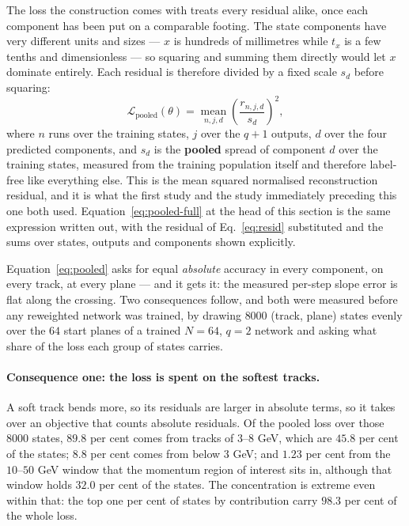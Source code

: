 \documentclass[11pt,a4paper]{article}
\begin{document}
The loss the construction comes with treats every residual alike, once each
component has been put on a comparable footing. The state components have very
different units and sizes --- $x$ is hundreds of millimetres while $t_x$ is a
few tenths and dimensionless --- so squaring and summing them directly would
let $x$ dominate entirely. Each residual is therefore divided by a fixed scale
$s_d$ before squaring:
%
\begin{equation}
  \mathcal{L}_{\mathrm{pooled}}(\theta)
    = \operatorname*{mean}_{n,j,d}
      \left(\frac{r_{n,j,d}}{s_d}\right)^{\!2},
  \label{eq:pooled}
\end{equation}
%
where $n$ runs over the training states, $j$ over the $q+1$ outputs, $d$ over
the four predicted components, and $s_d$ is the \textbf{pooled} spread of
component $d$ over the training states, measured from the training population
itself and therefore label-free like everything else. This is the mean squared
normalised reconstruction residual, and it is what the first study and the
study immediately preceding this one both used.
Equation~\eqref{eq:pooled-full} at the head of this section is the same
expression written out, with the residual of Eq.~\eqref{eq:resid} substituted
and the sums over states, outputs and components shown explicitly.

Equation~\eqref{eq:pooled} asks for equal \emph{absolute} accuracy in every
component, on every track, at every plane --- and it gets it: the measured
per-step slope error is flat along the crossing. Two consequences follow, and
both were measured before any reweighted network was trained, by drawing
$8000$ (track, plane) states evenly over the $64$ start planes of a trained
$N = 64$, $q = 2$ network and asking what share of the loss each group of
states carries.

\paragraph{Consequence one: the loss is spent on the softest tracks.} A soft
track bends more, so its residuals are larger in absolute terms, so it takes
over an objective that counts absolute residuals. Of the pooled loss over those
$8000$ states, $89.8$ per cent comes from tracks of $3$--$8$ GeV, which are
$45.8$ per cent of the states; $8.8$ per cent comes from below $3$ GeV; and
$1.23$ per cent from the $10$--$50$ GeV window that the momentum region of
interest sits in, although that window holds $32.0$ per cent of the states.
The concentration is extreme even within that: the top one per cent of states
by contribution carry $98.3$ per cent of the whole loss.
\end{document}
